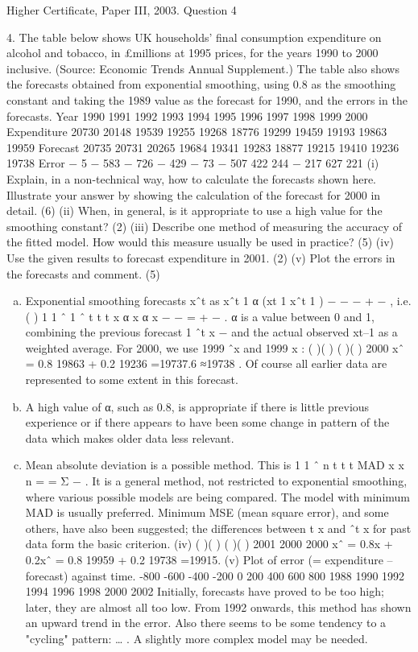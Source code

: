 \documentclass[a4paper,12pt]{article}
\begin{document}
Higher Certificate, Paper III, 2003. Question 4

\begin{framed}
4.
The table below shows UK households' final consumption expenditure on alcohol and
tobacco, in £millions at 1995 prices, for the years 1990 to 2000 inclusive. (Source:
Economic Trends Annual Supplement.) The table also shows the forecasts obtained
from exponential smoothing, using 0.8 as the smoothing constant and taking the 1989
value as the forecast for 1990, and the errors in the forecasts.
Year
1990
1991
1992
1993
1994
1995
1996
1997
1998
1999
2000
Expenditure
20730
20148
19539
19255
19268
18776
19299
19459
19193
19863
19959
Forecast
20735
20731
20265
19684
19341
19283
18877
19215
19410
19236
19738
Error
− 5
− 583
− 726
− 429
− 73
− 507
422
244
− 217
627
221
(i) Explain, in a non-technical way, how to calculate the forecasts shown here.
Illustrate your answer by showing the calculation of the forecast for 2000 in
detail.
(6)
(ii) When, in general, is it appropriate to use a high value for the smoothing
constant?
(2)
(iii) Describe one method of measuring the accuracy of the fitted model. How
would this measure usually be used in practice?
(5)
(iv) Use the given results to forecast expenditure in 2001.
(2)
(v)
Plot the errors in the forecasts and comment.
(5)
\end{framed}
\begin{enumerate}[(a)]
\item  Exponential smoothing forecasts xˆt as xˆt 1 α (xt 1 xˆt 1 ) − − − + − , i.e.
( ) 1 1 ˆ 1 ˆ t t t x α x α x − − = + − .
α is a value between 0 and 1, combining the previous forecast 1 ˆt x − and the actual
observed xt–1 as a weighted average.
For 2000, we use 1999 ˆx and 1999 x :
( )( ) ( )( ) 2000 xˆ = 0.8 19863 + 0.2 19236 =19737.6 ≈19738 .
Of course all earlier data are represented to some extent in this forecast.
\item A high value of α, such as 0.8, is appropriate if there is little previous
experience or if there appears to have been some change in pattern of the data which
makes older data less relevant.
\item Mean absolute deviation is a possible method. This is
1
1 ˆ
n
t t
t
MAD x x
n =
= Σ − .
It is a general method, not restricted to exponential smoothing, where various possible
models are being compared. The model with minimum MAD is usually preferred.
Minimum MSE (mean square error), and some others, have also been suggested; the
differences between t x and ˆt x for past data form the basic criterion.
(iv) ( )( ) ( )( ) 2001 2000 2000 xˆ = 0.8x + 0.2xˆ = 0.8 19959 + 0.2 19738 =19915.
(v) Plot of error (= expenditure – forecast) against time.
-800
-600
-400
-200
0
200
400
600
800
1988 1990 1992 1994 1996 1998 2000 2002
Initially, forecasts have proved to be too high; later, they are almost all too low.
From 1992 onwards, this method has shown an upward trend in the error. Also there
seems to be some tendency to a "cycling" pattern: … . A slightly
more complex model may be needed.
\end{enumerate}
\end{document}
